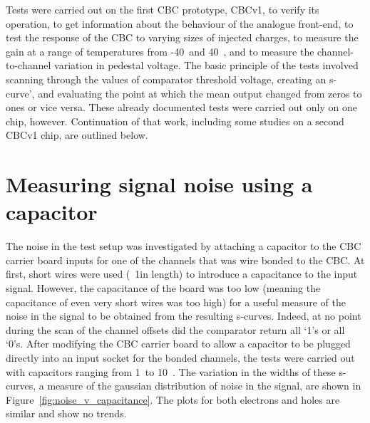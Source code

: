 Tests were carried out on the first CBC prototype, CBCv1, to verify its operation, to get information about
the behaviour of the analogue front-end, to test the response of the CBC to varying sizes of injected charges,
to measure the gain at a range of temperatures from -40~\degreeCelsius and 40~\degreeCelsius, and to measure
the channel-to-channel variation in pedestal voltage. The basic principle of the tests involved scanning
through the values of comparator threshold voltage, creating an s-curve', and evaluating the point at which
the mean output changed from zeros to ones or vice versa. These already documented tests were carried out only
on one chip, however. Continuation of that work, including some studies on a second CBCv1 chip, are outlined
below.

\section{Measuring signal noise using a capacitor}
\label{s:measuring_signal_noise_using_a_capacitor}

The noise in the test setup was investigated by attaching a capacitor to the CBC carrier board inputs for one
of the channels that was wire bonded to the CBC. At first, short wires were used (~1\cm in length) to
introduce a capacitance to the input signal. However, the capacitance of the board was too low (meaning the
capacitance of even very short wires was too high) for a useful measure of the noise in the signal to be
obtained from the resulting s-curves. Indeed, at no point during the scan of the channel offsets did the
comparator return all `1's or all `0's. After modifying the CBC carrier board to allow a capacitor to be
plugged directly into an input socket for the bonded channels, the tests were carried out with capacitors
ranging from 1~\pF to 10~\pF. The variation in the widths of these s-curves, a measure of the gaussian
distribution of noise in the signal, are shown in Figure~\ref{fig:noise_v_capacitance}. The plots for both
electrons and holes are similar and show no trends.

